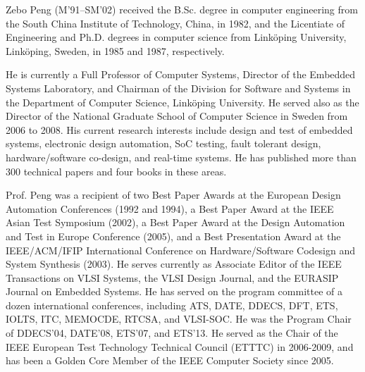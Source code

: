 \begin{biography}{Zebo Peng}
(M'91--SM'02) received the B.Sc. degree in computer engineering from the South China Institute of Technology, China, in 1982, and the Licentiate of Engineering and Ph.D. degrees in computer science from Link\"{o}ping University, Link\"{o}ping, Sweden, in 1985 and 1987, respectively.

He is currently a Full Professor of Computer Systems, Director of the Embedded Systems Laboratory, and Chairman of the Division for Software and Systems in the Department of Computer Science, Link\"{o}ping University.
He served also as the Director of the National Graduate School of Computer Science in Sweden from 2006 to 2008.
His current research interests include design and test of embedded systems, electronic design automation, SoC testing, fault tolerant design, hardware/software co-design, and real-time systems.
He has published more than 300 technical papers and four books in these areas.

Prof. Peng was a recipient of two Best Paper Awards at the European Design Automation Conferences (1992 and 1994), a Best Paper Award at the IEEE Asian Test Symposium (2002), a Best Paper Award at the Design Automation and Test in Europe Conference (2005), and a Best Presentation Award at the IEEE/ACM/IFIP International Conference on Hardware/Software Codesign and System Synthesis (2003).
He serves currently as Associate Editor of the IEEE Transactions on VLSI Systems, the VLSI Design Journal, and the EURASIP Journal on Embedded Systems.
He has served on the program committee of a dozen international conferences, including ATS, DATE, DDECS, DFT, ETS, IOLTS, ITC, MEMOCDE, RTCSA, and VLSI-SOC.
He was the Program Chair of DDECS'04, DATE'08, ETS'07, and ETS'13.
He served as the Chair of the IEEE European Test Technology Technical Council (ETTTC) in 2006-2009, and has been a Golden Core Member of the IEEE Computer Society since 2005.
\end{biography}
